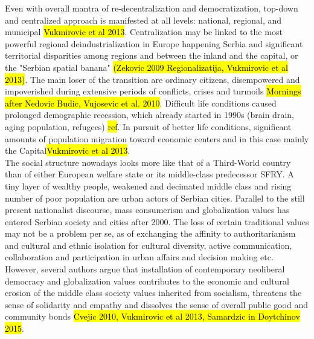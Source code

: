 \documentclass[11pt]{report}
\begin{document}
Even with overall mantra of re-decentralization and democratization, top-down and centralized approach is manifested at all levels: national, regional, and municipal \hl{Vukmirovic et al 2013}. Centralization may be linked to the most powerful regional deindustrialization in Europe happening Serbia and significant territorial disparities among regions and between the inland and the capital, or the "Serbian spatial banana"\hl{\footnotemark} \hl{(Zekovic 2009 Regionalizatija, Vukmirovic et al 2013)}. The main loser of the transition are ordinary citizens, disempowered and impoverished during extensive periods of conflicts, crises and turmoils \hl{Mornings after Nedovic Budic, Vujosevic et al. 2010}. Difficult life conditions caused prolonged demographic recession, which already started in 1990s (brain drain, aging population, refugees) \hl{ref}. In pursuit of better life conditions, significant amounts of population migration toward economic centers and in this case mainly the Capital\hl{Vukmirovic et al 2013}.
\\
The social structure nowadays looks more like that of a Third-World country than of either European welfare state or its middle-class predecessor SFRY. A tiny layer of wealthy people, weakened and decimated middle class and rising number of poor population are urban actors of Serbian cities. Parallel to the still present nationalist discourse, mass consumerism and globalization values has entered Serbian society and cities after 2000. The loss of certain traditional values may not be a problem per se, as of exchanging the affinity to authoritarianism and cultural and ethnic isolation for cultural diversity, active communication, collaboration and participation in urban affairs and decision making etc. However, several authors argue that installation of contemporary neoliberal democracy and globalization values contributes to the economic and cultural erosion of the middle class society values inherited from socialism, threatens the sense of solidarity and empathy and dissolves the sense of overall public good and community bonds 
\hl{Cvejic 2010, Vukmirovic et al 2013, Samardzic in Doytchinov 2015}.
\end{document}
